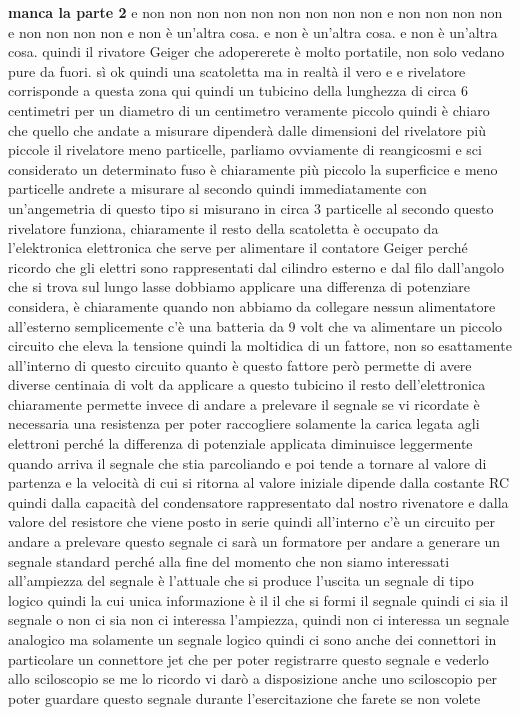 {\textbf{manca la parte 2}
e non non non non non non non non non e non non non non e non non non non e non è un'altra cosa. e non è un'altra cosa. e non è un'altra cosa. quindi il rivatore Geiger che adopererete è molto portatile, non solo vedano pure da fuori. sì ok quindi una scatoletta ma in realtà il vero e e rivelatore corrisponde a questa zona qui quindi un tubicino della lunghezza di circa 6 centimetri per un diametro di un centimetro veramente piccolo quindi è chiaro che quello che andate a misurare dipenderà dalle dimensioni del rivelatore più piccole il rivelatore meno particelle, parliamo ovviamente di reangicosmi e sci considerato un determinato fuso è chiaramente più piccolo la superficice e meno particelle andrete a misurare al secondo quindi immediatamente con un'angemetria di questo tipo si misurano in circa 3 particelle al secondo questo rivelatore funziona, chiaramente il resto della scatoletta è occupato da l'elektronica elettronica che serve per alimentare il contatore Geiger perché ricordo che gli elettri sono rappresentati dal cilindro esterno e dal filo dall'angolo che si trova sul lungo lasse dobbiamo applicare una differenza di potenziare considera, è chiaramente quando non abbiamo da collegare nessun alimentatore all'esterno semplicemente c'è una batteria da 9 volt che va alimentare un piccolo circuito che eleva la tensione quindi la moltidica di un fattore, non so esattamente all'interno di questo circuito quanto è questo fattore però permette di avere diverse centinaia di volt da applicare a questo tubicino il resto dell'elettronica chiaramente permette invece di andare a prelevare il segnale se vi ricordate è necessaria una resistenza per poter raccogliere solamente la carica legata agli elettroni perché la differenza di potenziale applicata diminuisce leggermente quando arriva il segnale che stia parcoliando e poi tende a tornare al valore di partenza e la velocità di cui si ritorna al valore iniziale dipende dalla costante RC quindi dalla capacità del condensatore rappresentato dal nostro rivenatore e dalla valore del resistore che viene posto in serie quindi all'interno c'è un circuito per andare a prelevare questo segnale ci sarà un formatore per andare a generare un segnale standard perché alla fine del momento che non siamo interessati all'ampiezza del segnale è l'attuale che si produce l'uscita un segnale di tipo logico quindi la cui unica informazione è il il che si formi il segnale quindi ci sia il segnale o non ci sia non ci interessa l'ampiezza, quindi non ci interessa un segnale analogico ma solamente un segnale logico quindi ci sono anche dei connettori in particolare un connettore jet che per poter registrarre questo segnale e vederlo allo sciloscopio se me lo ricordo vi darò a disposizione anche uno sciloscopio per poter guardare questo segnale durante l'esercitazione che farete se non volete 

}
